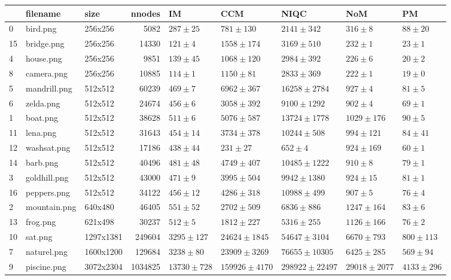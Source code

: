 \begin{tabular}{lllrlllll}
\toprule
{} &      filename &       size &   nnodes &             IM &              CCM &              NIQC &             NoM &            PM \\
\midrule
0  &      bird.png &    256x256 &     5082 &     $287\pm25$ &      $781\pm130$ &      $2141\pm342$ &       $316\pm8$ &     $88\pm20$ \\
15 &    bridge.png &    256x256 &    14330 &      $121\pm4$ &     $1558\pm174$ &      $3169\pm510$ &       $232\pm1$ &      $23\pm1$ \\
4  &     house.png &    256x256 &     9851 &     $139\pm45$ &     $1068\pm120$ &      $2984\pm392$ &       $226\pm6$ &      $20\pm2$ \\
8  &    camera.png &    256x256 &    10885 &      $114\pm1$ &      $1150\pm81$ &      $2833\pm369$ &       $222\pm1$ &      $19\pm0$ \\
5  &  mandrill.png &    512x512 &    60239 &      $469\pm7$ &     $6962\pm367$ &    $16258\pm2784$ &       $927\pm4$ &      $81\pm5$ \\
6  &     zelda.png &    512x512 &    24674 &      $456\pm6$ &     $3058\pm392$ &     $9100\pm1292$ &       $902\pm4$ &      $69\pm1$ \\
1  &      boat.png &    512x512 &    38628 &      $511\pm6$ &     $5076\pm587$ &    $13724\pm1778$ &    $1029\pm176$ &      $90\pm5$ \\
11 &      lena.png &    512x512 &    31643 &     $454\pm14$ &     $3734\pm378$ &     $10244\pm508$ &     $994\pm121$ &     $84\pm41$ \\
12 &   washsat.png &    512x512 &    17186 &     $438\pm44$ &       $231\pm27$ &         $652\pm4$ &     $924\pm169$ &      $60\pm1$ \\
14 &      barb.png &    512x512 &    40496 &     $481\pm48$ &     $4749\pm407$ &    $10485\pm1222$ &       $910\pm8$ &      $79\pm1$ \\
3  &  goldhill.png &    512x512 &    43000 &      $471\pm9$ &     $3995\pm504$ &     $9942\pm1380$ &      $924\pm15$ &      $81\pm1$ \\
16 &   peppers.png &    512x512 &    34122 &     $456\pm12$ &     $4286\pm318$ &     $10988\pm499$ &       $907\pm5$ &      $76\pm4$ \\
2  &  mountain.png &    640x480 &    46405 &     $551\pm52$ &     $2702\pm509$ &      $6836\pm886$ &    $1247\pm164$ &      $83\pm6$ \\
13 &      frog.png &    621x498 &    30237 &      $512\pm5$ &     $1812\pm227$ &      $5316\pm255$ &    $1126\pm166$ &      $76\pm2$ \\
10 &       sat.png &  1297x1381 &   249604 &   $3295\pm127$ &   $24624\pm1845$ &    $54647\pm3104$ &    $6670\pm793$ &   $800\pm113$ \\
7  &   naturel.png &  1600x1200 &   129684 &    $3238\pm80$ &   $23909\pm3269$ &   $76655\pm10305$ &    $6425\pm285$ &    $569\pm94$ \\
9  &   piscine.png &  3072x2304 &  1034825 &  $13730\pm728$ &  $159926\pm4170$ &  $298922\pm22497$ &  $29018\pm2077$ &  $4133\pm296$ \\
\bottomrule
\end{tabular}
